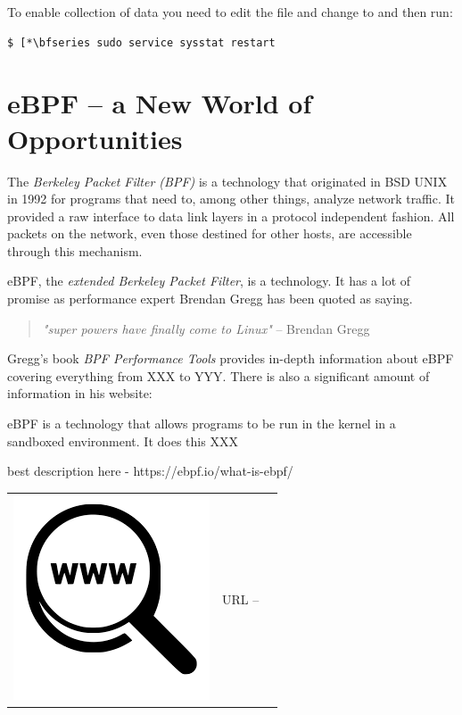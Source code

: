 \noindent
To enable collection of data you need to edit the file  and change  to  and then run:

\begin{lstlisting}
$ [*\bfseries sudo service sysstat restart
\end{lstlisting}

\section{eBPF -- a New World of Opportunities}

The \textit{Berkeley Packet Filter (BPF)} is a technology that originated in BSD UNIX in 1992 for programs that need to, among other things, analyze network traffic. It provided a raw interface to data link layers in a protocol independent fashion. All packets on the network, even those destined for other hosts, are accessible through this mechanism.

eBPF, the \textit{extended Berkeley Packet Filter}, is a technology. It has a lot of promise as performance expert Brendan Gregg has been quoted as saying.

\begin{quote}
\textit{"super powers have finally come to Linux"} -- Brendan Gregg
\end{quote}

\noindent
Gregg's book \textit{BPF Performance Tools} \cite{gregg-ebpf} provides in-depth information about eBPF covering everything from XXX to YYY. There is also a significant amount of information in his website:

eBPF is a technology that allows programs to be run in the kernel in a sandboxed environment. It does this XXX

best description here - https://ebpf.io/what-is-ebpf/

\begin{table}[h]
\begin{tabular}{lcl}
\parbox[r]{0.5in}{\includegraphics[scale=0.15]{figures/url.png}} & \parbox[l]{0.55in}{URL  -- } & \parbox[l]{3in}{}
\end{tabular}
\end{table}

